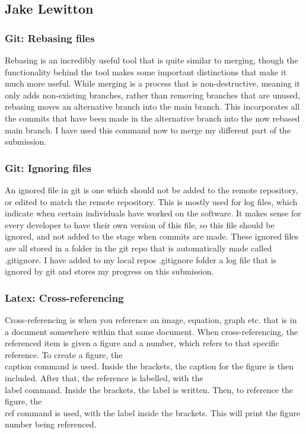 \documentclass[a4paper, 11pt]{report}
\begin{document}
\subsection{Jake Lewitton}
\subsubsection{Git: Rebasing files}
Rebasing is an incredibly useful tool that is quite similar to merging, though the functionality behind the tool makes some important distinctions that make it much more useful. While merging is a process that is non-destructive, meaning it only adds non-existing branches, rather than removing branches that are unused, rebasing moves an alternative branch into the main branch. This incorporates all the commits that have been made in the alternative branch into the now rebased main branch. I have used this command now to merge my different part of the submission.\cite{jake8}\cite{jake9}
\subsubsection{Git: Ignoring files}
An ignored file in git is one which should not be added to the remote repository, or edited to match the remote repository. This is mostly used for log files, which indicate when certain individuals have worked on the software. It makes sense for every developer to have their own version of this file, so this file should be ignored, and not added to the stage when commits are made. These ignored files are all stored in a folder in the git repo that is automatically made called .gitignore. I have added to my local repos .gitignore folder a log file that is ignored by git and stores my progress on this submission.\cite{jake10}
\subsubsection{Latex: Cross-referencing}
Cross-referencing is when you reference an image, equation, graph etc. that is in a document somewhere within that same document. When cross-referencing, the referenced item is given a figure and a number, which refers to that specific reference. To create a figure, the \\caption{} command is used. Inside the brackets, the caption for the figure is then included. After that, the reference is labelled, with the \\label{} command. Inside the brackets, the label is written. Then, to reference the figure, the \\ref{} command is used, with the label inside the brackets. This will print the figure number being referenced.\cite{jake11}
\end{document}
